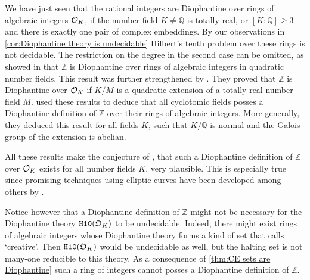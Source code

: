 We have just seen that the rational integers are Diophantine over rings of
algebraic integers \(\mathcal{O}_{K}\), if the number field \(K ≠ ℚ\) is totally real,
or \([K : ℚ] ≥ 3\) and there is exactly one pair of complex embeddings. By our
observations in \cref{cor:Diophantine theory is undecidable} Hilbert's tenth
problem over these rings is not decidable. The restriction on the degree in the
second case can be omitted, as \textcite{Denef1975} showed in
\citeyear{Denef1975} that \(ℤ\) is Diophantine over rings of algebraic integers
in quadratic number fields. This result was further strengthened by
\textcite{Denef1978}. They proved that \(ℤ\) is Diophantine over \(\mathcal{O}_{K}\) if
\(K / M\) is a quadratic extension of a totally real number field \(M\).
\textcite{Shapiro1989} used these results to deduce that all cyclotomic fields
posses a Diophantine definition of \(ℤ\) over their rings of algebraic integers.
More generally, they deduced this result for all fields \(K\), such that \(K/ℚ\)
is normal and the Galois group of the extension is abelian.

All these results make the conjecture of \textcite{Denef1978}, that such a
Diophantine definition of \(ℤ\) over \(\mathcal{O}_{K}\) exists for all number fields
\(K\), very plausible. This is especially true since promising techniques using
elliptic curves have been developed among others by \textcite{Poonen2002}.

Notice however that a Diophantine definition of \(ℤ\) might not be necessary for
the Diophantine theory \(\mathtt{H10}(\mathfrak{O}_K)\) to be undecidable. Indeed,
there might exist rings of algebraic integers whose Diophantine theory forms a
kind of set that \textcite{Post1944} calls ‘creative’. Then
\(\mathtt{H10}(\mathfrak{O}_K)\) would be undecidable as well, but the halting set
is not many-one reducible to this theory. As a consequence of \cref{thm:CE sets
are Diophantine} such a ring of integers cannot posses a Diophantine definition
of \(ℤ\).
